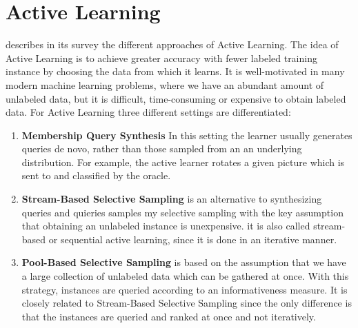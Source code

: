 \section{Active Learning}
\cite{Settles2009ActiveLL} describes in its survey the different approaches of Active Learning.
The idea of Active Learning is to achieve greater accuracy with fewer labeled training instance by choosing the data from which it learns.
It is well-motivated in many modern machine learning problems, where we have an abundant amount of unlabeled data, but it is difficult, time-consuming or expensive to obtain labeled data.
For Active Learning three different settings are differentiated:
\begin{enumerate}
    \item \textbf{Membership Query Synthesis}
    In this setting the learner usually generates queries de novo, rather than those sampled from an an underlying distribution. 
    For example, the active learner rotates a given picture which is sent to and classified by the oracle.
    
    \item \textbf{Stream-Based Selective Sampling}
    is an alternative to synthesizing queries and quieries samples my selective sampling with the key assumption that obtaining an unlabeled instance is unexpensive.
    it is also called stream-based or sequential active learning, since it is done in an iterative manner.
    
    \item \textbf{Pool-Based Selective Sampling} is based on the assumption that we have a large collection of unlabeled data which can be gathered at once.
    With this strategy, instances are queried according to an informativeness measure.
    It is closely related to Stream-Based Selective Sampling since the only difference is that the instances are queried and ranked at once and not iteratively.
\end{enumerate}






%            
